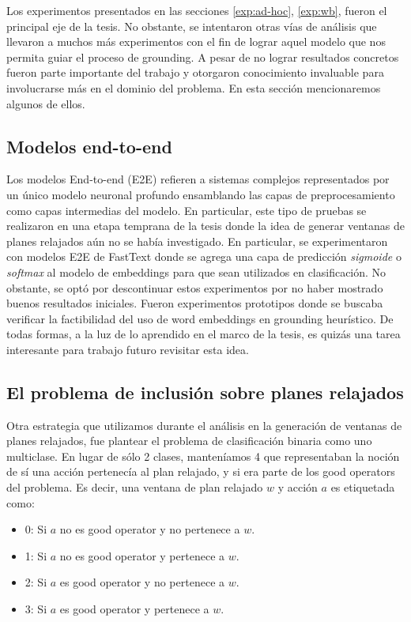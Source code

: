 Los experimentos presentados en las secciones \ref{exp:ad-hoc}, \ref{exp:wb},
fueron el principal eje de la tesis. No obstante, se intentaron otras vías de
análisis que llevaron a muchos más experimentos con el fin de lograr aquel
modelo que nos permita guiar el proceso de grounding. A pesar de no lograr
resultados concretos fueron parte importante del trabajo y otorgaron
conocimiento invaluable para involucrarse más en el dominio del problema.
En esta sección mencionaremos algunos de ellos.

\subsection{Modelos end-to-end}

Los modelos End-to-end (E2E) refieren a sistemas complejos representados por un
único modelo neuronal profundo ensamblando las capas de preprocesamiento como
capas intermedias del modelo. En particular, este tipo de pruebas se realizaron
en una etapa temprana de la tesis donde la idea de generar ventanas de planes
relajados aún no se había investigado. En particular, se experimentaron con
modelos E2E de FastText donde se agrega una capa de predicción \emph{sigmoide} o
\emph{softmax} al modelo de embeddings para que sean utilizados en
clasificación. No obstante, se optó por descontinuar estos experimentos por no
haber mostrado buenos resultados iniciales. Fueron experimentos prototipos donde
se buscaba verificar la factibilidad del uso de word embeddings en grounding
heurístico. De todas formas, a la luz de lo aprendido en el marco de la tesis,
es quizás una tarea interesante para trabajo futuro revisitar esta idea.

\subsection{El problema de inclusión sobre planes relajados}

Otra estrategia que utilizamos durante el análisis en la generación de ventanas
de planes relajados, fue plantear el problema de clasificación binaria como uno
multiclase. En lugar de sólo 2 clases, manteníamos 4 que representaban la noción
de sí una acción pertenecía al plan relajado, y si era parte de los good
operators del problema. Es decir, una ventana de plan relajado $w$ y acción $a$
es etiquetada como:

\begin{itemize}
    \item 0: Si $a$ no es good operator y no pertenece a $w$.
    \item 1: Si $a$ no es good operator y pertenece a $w$.
    \item 2: Si $a$ es good operator y no pertenece a $w$.
    \item 3: Si $a$ es good operator y pertenece a $w$.
\end{itemize}

